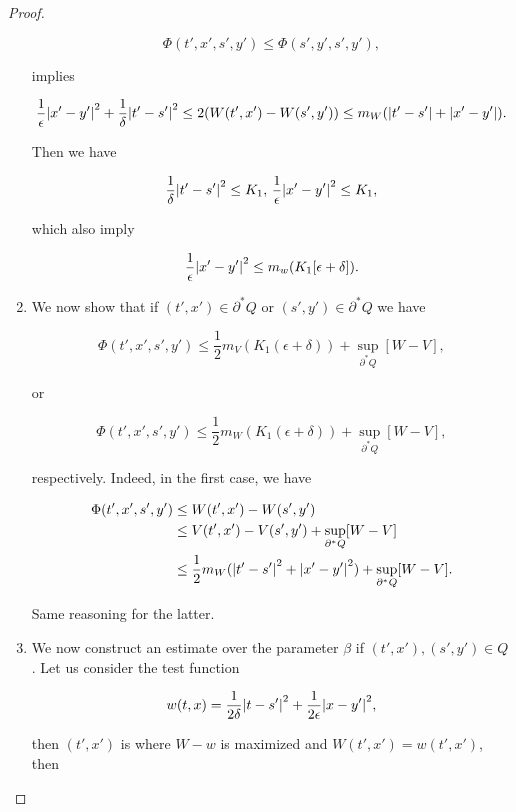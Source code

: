 \begin{proof}
\begin{enumerate}
        \[\Phi(t',x',s',y') \leq \Phi(s',y',s',y'),\]

        implies

        \[\frac{1}{\epsilon}\abs{x'-y'}^2 + \frac{1}{\delta}\abs{t'-s'}^2\leq 2(W(t',x')-W(s',y')) \leq m_W(\abs{t'-s'}+\abs{x'-y'}).\]

        Then we have

        \[\frac{1}{\delta}\abs{t'-s'}^2\leq K_1,\,\frac{1}{\epsilon}\abs{x'-y'}^2\leq K_1,\]

        which also imply

        \[\frac{1}{\epsilon}\abs{x'-y'}^2\leq m_w(K_1[\epsilon+\delta]).\]

        \item We now show that if $(t',x')\in\partial^{\ast}Q$ or $(s',y')\in\partial^{\ast}Q$ we have
        
        \begin{equation}\label{4-2-InProofSup:phiestim1}
            \Phi(t',x',s',y') \leq\frac{1}{2}m_V(K_1(\epsilon+\delta)) + \sup_{\partial^{\ast}Q}[W-V],
        \end{equation}

        or 

        \begin{equation}\label{4-2-InProofSup:phiestim2}
            \Phi(t',x',s',y') \leq\frac{1}{2}m_W(K_1(\epsilon+\delta)) + \sup_{\partial^{\ast}Q}[W-V],
        \end{equation}

        respectively. Indeed, in the first case, we have

        \begin{align*}\Phi(t',x',s',y')&\leq W(t',x') - W(s',y') \\ & \leq  V(t',x') - V(s',y') + \sup_{\partial^{\ast}Q}[W-V] \\
        & \leq \frac{1}{2}m_W(\abs{t'-s'}^2+\abs{x'-y'}^2) +  \sup_{\partial^{\ast}Q}[W-V]. \end{align*}

        Same reasoning for the latter.

        \item We now construct an estimate over the parameter $\beta$ if $(t',x'),(s',y')\in Q$. Let us consider the test function
        
        \[w(t,x) = \frac{1}{2\delta}\abs{t-s'}^2 + \frac{1}{2\epsilon}\abs{x-y'}^2,\]

        then $(t',x')$ is where $W-w$ is maximized and $W(t',x')=w(t',x')$, then


\end{enumerate}
\end{proof}

